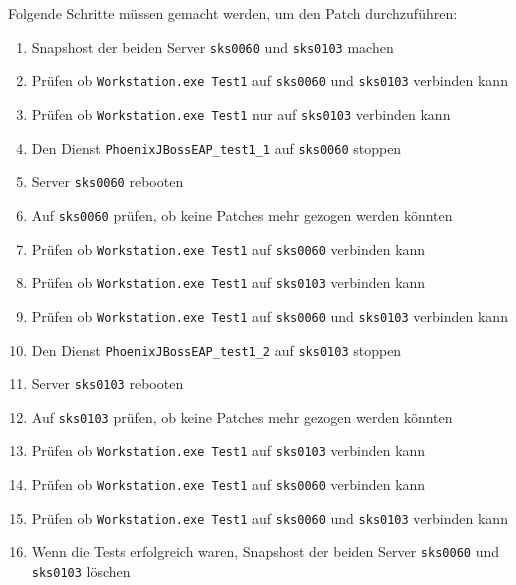 \begin{flushleft}
    Folgende Schritte müssen gemacht werden, um den Patch durchzuführen:
    \begin{enumerate}
        \item Snapshost der beiden Server \texttt{sks0060} und \texttt{sks0103} machen
        \item Prüfen ob \texttt{Workstation.exe Test1} auf \texttt{sks0060} und \texttt{sks0103} verbinden kann
        \item Prüfen ob \texttt{Workstation.exe Test1} nur auf \texttt{sks0103} verbinden kann
        \item Den Dienst \texttt{PhoenixJBossEAP\_test1\_1} auf \texttt{sks0060} stoppen
        \item Server \texttt{sks0060} rebooten
        \item Auf \texttt{sks0060} prüfen, ob keine Patches mehr gezogen werden könnten
        \item Prüfen ob \texttt{Workstation.exe Test1} auf \texttt{sks0060} verbinden kann
        \item Prüfen ob \texttt{Workstation.exe Test1} auf \texttt{sks0103} verbinden kann
        \item Prüfen ob \texttt{Workstation.exe Test1} auf \texttt{sks0060} und \texttt{sks0103} verbinden kann
        \item Den Dienst \texttt{PhoenixJBossEAP\_test1\_2} auf \texttt{sks0103} stoppen
        \item Server \texttt{sks0103} rebooten
        \item Auf \texttt{sks0103} prüfen, ob keine Patches mehr gezogen werden könnten
        \item Prüfen ob \texttt{Workstation.exe Test1} auf \texttt{sks0103} verbinden kann
        \item Prüfen ob \texttt{Workstation.exe Test1} auf \texttt{sks0060} verbinden kann
        \item Prüfen ob \texttt{Workstation.exe Test1} auf \texttt{sks0060} und \texttt{sks0103} verbinden kann
        \item Wenn die Tests erfolgreich waren, Snapshost der beiden Server \texttt{sks0060} und \texttt{sks0103} löschen
    \end{enumerate}
\end{flushleft}
